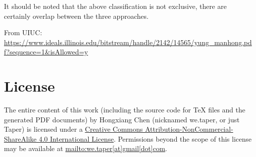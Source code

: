 \documentclass{article}
\numberwithin{equation}{subsection} %
\theoremstyle{definition}
\begin{document}
    It should be noted that the above classification is not exclusive,
    there are certainly overlap between the three approaches. 
\begin{thebibliography}{1}
     From UIUC:
    \url{https://www.ideals.illinois.edu/bitstream/handle/2142/14565/yung_manhong.pdf?sequence=1&isAllowed=y}
\end{thebibliography}
\printnomenclature
\section{License}
The entire content of this work (including the source code
for TeX files and the generated PDF documents) by 
Hongxiang Chen (nicknamed we.taper, or just Taper) is
licensed under a 
\href{http://creativecommons.org/licenses/by-nc-sa/4.0/}{Creative 
Commons Attribution-NonCommercial-ShareAlike 4.0 International 
License}. Permissions beyond the scope of this 
license may be available at \url{mailto:we.taper[at]gmail[dot]com}.
\end{document}
